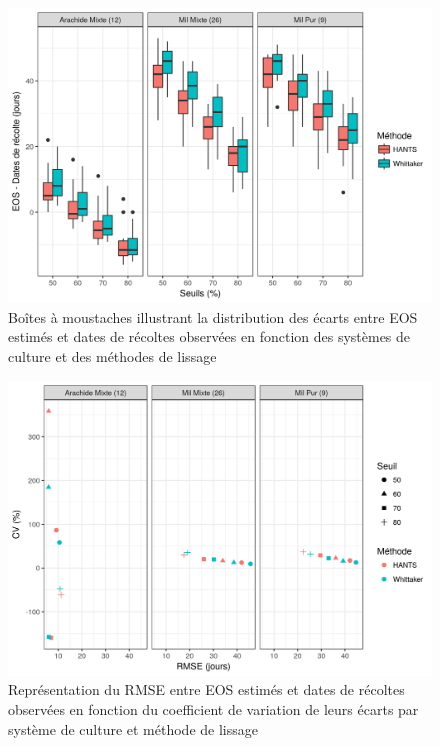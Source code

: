 \begin{figure}[htbp]
 \begin{center}
  \includegraphics[scale=0.7]{resultats_discussions/EOS_Boxplot.png} 
 \end{center}
 \caption[Distribution des écarts entre EOS et dates de récoltes]{Boîtes à moustaches illustrant la distribution des écarts entre EOS estimés et dates de récoltes observées en fonction des systèmes de culture et des méthodes de lissage}
 \label{fig-eosboxplot}
\end{figure}

\begin{figure}[htbp]
 \begin{center}
  \includegraphics[scale=0.7]{resultats_discussions/EOS_RMSE_vs_CV.png} 
 \end{center}
 \caption[EOS -- RMSE vs CV]{Représentation du RMSE entre EOS estimés et dates de récoltes observées en fonction du coefficient de variation de leurs écarts par système de culture et méthode de lissage}
 \label{fig-sos-rmse-cv}
\end{figure}


